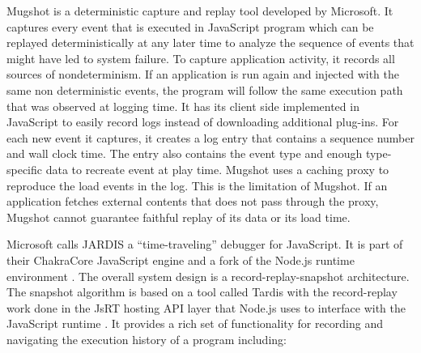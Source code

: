\documentclass[12pt,journal]{IEEEtran}
\begin{document}
\par
Mugshot \cite{Mickens:2010:MDC:1855711.1855722} is a deterministic capture and replay tool developed by Microsoft. It captures every event that is executed in JavaScript program which can be replayed deterministically at any later time to analyze the sequence of events that might have led to system failure. To capture application activity, it records all sources of nondeterminism. If an application is run again and injected with the same non deterministic events, the program will follow the same execution path that was observed at logging time. It has its client side implemented in JavaScript to easily record logs instead of downloading additional plug-ins. For each new event it captures, it creates a log entry that contains a sequence number and wall clock time. The entry also contains the event type and enough type-specific data to recreate event at play time. Mugshot uses a caching proxy to reproduce the load events in the log. This is the limitation of Mugshot. If an application fetches external contents that does not pass through the proxy, Mugshot cannot guarantee faithful replay of its data or its load time.

\par
Microsoft calls JARDIS a ``time-traveling'' debugger for JavaScript. It is part of their ChakraCore JavaScript engine and a fork of the Node.js runtime environment \cite{time-travel-debugging-javascriptnode-js}. The overall system design is a record-replay-snapshot architecture. The snapshot algorithm is based on a tool called Tardis with the record-replay work done in the JsRT hosting API layer that Node.js uses to interface with the JavaScript runtime \cite{Barr:2014:TAT:2714064.2660209}.
It provides a rich set of functionality for recording and navigating the execution history of a program including: \\
\end{document}

